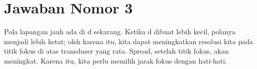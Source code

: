 \section{Jawaban Nomor 3}
Pola lapangan jauh ada di d sekarang. Ketika d dibuat lebih kecil, polanya menjadi lebih ketat; oleh karena itu, kita dapat meningkatkan resolusi kita pada titik fokus di atas transduser yang rata. Spread, setelah titik fokus, akan meningkat. Karena itu, kita perlu memilih jarak fokus dengan hati-hati.